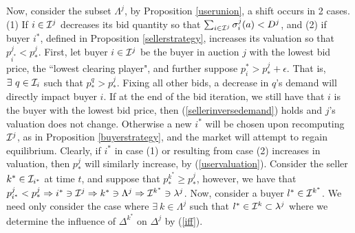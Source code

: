 {Now, consider the subset $\Lambda^j$, by
Proposition \ref{userunion}, a shift occurs in 2 cases. (1) If $i\in\mathcal{I}^j$
decreases its bid quantity so that $\sum_{i\in\mathcal{I}^j}
\sigma_i^j(a) < D^j$, and (2) if buyer $i^*$, defined in Proposition
\ref{sellerstrategy}, increases its valuation so that $p_{i^*}^j <
p_*^j$. First, let buyer $i\in\mathcal{I}^j$ be the buyer in auction $j$ with the
lowest bid price, the ``lowest clearing player",
and further suppose $p_i^* > p_*^j + \epsilon$. That is, $\exists \ q \in \mathcal{I}_i$ such
that $p_*^q > p_*^j$. Fixing all other bids, a decrease in $q$'s demand will
directly impact buyer $i$. If at the end of the bid iteration, we still have that $i$ is the
buyer with the lowest bid price, then (\ref{sellerinversedemand}) holds and $j$'s valuation does not change. Otherwise a new $i^*$ will be chosen upon
recomputing $\mathcal{I}^j$, as in Proposition \ref{buyerstrategy}, and the market
will attempt to regain equilibrium.
Clearly, if $i^*$ in case (1) or resulting from case (2) increases in valuation,
then $p_*^j$ will similarly increase, by (\ref{uservaluation}). Consider the 
seller $k^*\in\mathcal{I}_{i^*}$ at time $t$, and suppose that $p_*^{k^*} \ge p_*^j$, however, we have that $p_{i^*}^j <
p_*^j \Rightarrow i^* \ni \mathcal{I}^j \Rightarrow k^*\ni\Lambda^j\Rightarrow \mathcal{I}^{k^*} \ni
\lambda^j$. Now, consider a buyer $l^*\in\mathcal{I}^{k^*}$. We need only consider the
case where $\exists \ k \in\Lambda^j$ such that $l^*\in\mathcal{I}^k\subset \lambda^j$
where we determine the influence of $\Delta^{k^*}$ on $\Delta^j$ by (\ref{iff}). 

}
